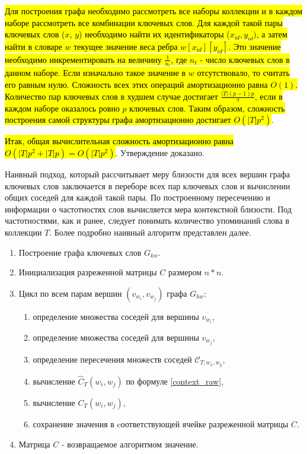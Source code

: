 \hl{Для построения графа необходимо рассмотреть все наборы коллекции и в каждом наборе рассмотреть все комбинации ключевых слов. Для каждой такой пары ключевых слов ($x$, $y$) необходимо найти их идентификаторы ($x_{id}, y_{id})$, а затем найти в словаре $w$ текущее значение веса ребра $w[x_{id}][y_{id}]$. Это значение необходимо инкрементировать на величину $\frac{1}{n_t}$, где $n_t$ - число ключевых слов в данном наборе. Если изначально такое значение в $w$ отсутствовало, то считать его равным нулю. Сложность всех этих операций амортизационно равна $O(1)$. Количество пар ключевых слов в худшем случае достигает $\frac{|T|(p-1)p}{2}$, если в каждом наборе оказалось ровно $p$ ключевых слов. Таким образом, сложность построения самой структуры графа амортизационно достигает $O(|T|p^2)$}.

\hl{Итак, общая вычислительная сложность амортизационно равна $O(|T|p^2 + |T|p) = O(|T|p^2)$}. Утверждение доказано.

Наивный подход, который рассчитывает меру близости для всех вершин графа ключевых слов заключается в переборе всех пар ключевых слов и вычислении общих соседей для каждой такой пары. По построенному пересечению и информации о частотностях слов вычисляется мера контекстной близости. Под частотностями, как и ранее, следует понимать количество упоминаний слова в коллекции $T$. Более подробно наивный алгоритм представлен далее.
\begin{enumerate}
    \item Построение графа ключевых слов $G_{kw}$.
    \item Инициализация разреженной матрицы $C$ размером $n * n$.
    \item Цикл по всем парам вершин $(v_{w_i}, v_{w_j})$ графа $G_{kw}$:
        \begin{enumerate}
            \item определение множества соседей для вершины $v_{w_i}$,
            \item определение множества соседей для вершины $v_{w_j}$,
            \item определение пересечения множеств соседей $\mathcal{C}_{T;w_x, w_y}$,
            \item вычисление $\hat{C}_T(w_i, w_j)$ по формуле \ref{context_raw},
            \item вычисление $C_T(w_i, w_j)$,
            \item сохранение значения в cоответствующей ячейке разреженной матрицы $C$.
        \end{enumerate}
    \item Матрица $C$ - возвращаемое алгоритмом значение.
\end{enumerate}

